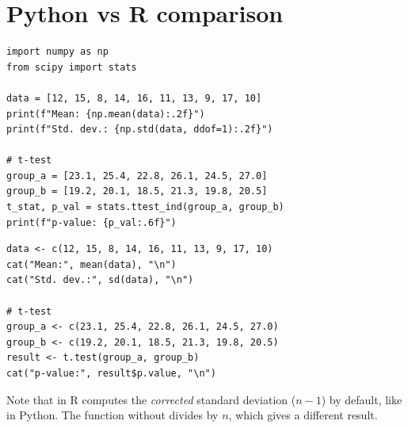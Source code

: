 \section{Python vs R comparison}

\begin{example}

\begin{codeblock}[title=\textbf{Python}]
\begin{verbatim}
import numpy as np
from scipy import stats

data = [12, 15, 8, 14, 16, 11, 13, 9, 17, 10]
print(f"Mean: {np.mean(data):.2f}")
print(f"Std. dev.: {np.std(data, ddof=1):.2f}")

# t-test
group_a = [23.1, 25.4, 22.8, 26.1, 24.5, 27.0]
group_b = [19.2, 20.1, 18.5, 21.3, 19.8, 20.5]
t_stat, p_val = stats.ttest_ind(group_a, group_b)
print(f"p-value: {p_val:.6f}")
\end{verbatim}
\end{codeblock}

\begin{codeblock}[title=\textbf{R}]
\begin{verbatim}
data <- c(12, 15, 8, 14, 16, 11, 13, 9, 17, 10)
cat("Mean:", mean(data), "\n")
cat("Std. dev.:", sd(data), "\n")

# t-test
group_a <- c(23.1, 25.4, 22.8, 26.1, 24.5, 27.0)
group_b <- c(19.2, 20.1, 18.5, 21.3, 19.8, 20.5)
result <- t.test(group_a, group_b)
cat("p-value:", result$p.value, "\n")
\end{verbatim}
\end{codeblock}
\end{example}

\begin{remark}
Note that  in R computes the \emph{corrected} standard deviation ($n-1$) by default,
like  in Python. The function  without
 divides by $n$, which gives a different result.
\end{remark}

